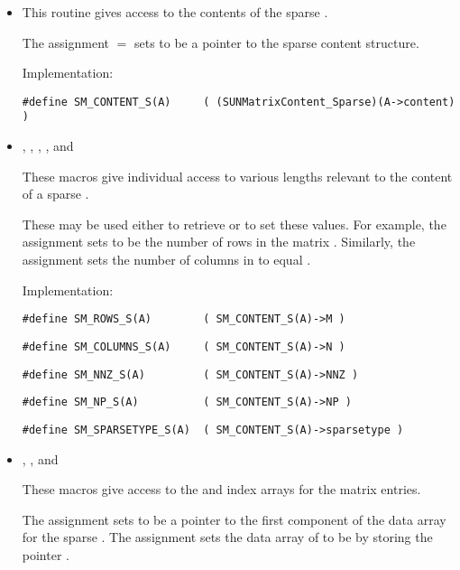 \begin{itemize}

\item {}
    
  This routine gives access to the contents of the
  sparse .
  
  The assignment  $=$  sets           
   to be a pointer to the sparse  content  
  structure.                                             
                                                            
  Implementation: 
  
  \verb|#define SM_CONTENT_S(A)     ( (SUNMatrixContent_Sparse)(A->content) )|
  
\item {}, , , , and 

  These macros give individual access to various lengths relevant to the
  content of a sparse .
                                                               
  These may be used either to retrieve or to set these values.  For
  example, the assignment  sets  to be
  the number of rows in the matrix .  Similarly, the
  assignment  sets the number of
  columns in  to equal .
  
  Implementation: 
  
  \verb|#define SM_ROWS_S(A)        ( SM_CONTENT_S(A)->M )|

  \verb|#define SM_COLUMNS_S(A)     ( SM_CONTENT_S(A)->N )|

  \verb|#define SM_NNZ_S(A)         ( SM_CONTENT_S(A)->NNZ )|

  \verb|#define SM_NP_S(A)          ( SM_CONTENT_S(A)->NP )|

  \verb|#define SM_SPARSETYPE_S(A)  ( SM_CONTENT_S(A)->sparsetype )|


\item {}, , and 
                                                            
  These macros give access to the  and index arrays for
  the matrix entries.

  The assignment  sets  to be     
  a pointer to the first component of the data array for the
  sparse  .  The assignment  sets the data array of  to be  by storing
  the pointer . 
  

\end{itemize}
